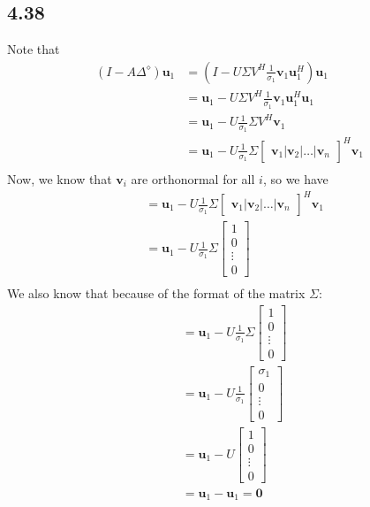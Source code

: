 \documentclass[letterpaper,12pt]{article}
\theoremstyle{definition}
\begin{document}
\subsection*{4.38}
Note that
\begin{align*}
    (I - A\Delta^{\diamond})\textbf{u}_1 &= (I - U\Sigma V^H\frac{1}{\sigma_1}\textbf{v}_1 \textbf{u}_1^H) \textbf{u}_1 \\
    &=  \textbf{u}_1 - U\Sigma V^H\frac{1}{\sigma_1}\textbf{v}_1 \textbf{u}_1^H \textbf{u}_1 \\
    &=  \textbf{u}_1 - U\frac{1}{\sigma_1}\Sigma V^H\textbf{v}_1 \\
    &=  \textbf{u}_1 - U\frac{1}{\sigma_1}\Sigma     
    \begin{bmatrix} \textbf{v}_1 | \textbf{v}_2 | \dots |\textbf{v}_n \end{bmatrix}^H\textbf{v}_1 \\
\end{align*}
Now, we know that $\textbf{v}_i$ are orthonormal for all $i$, so we have 
\begin{align*}
    &=  \textbf{u}_1 - U\frac{1}{\sigma_1}\Sigma     
    \begin{bmatrix} \textbf{v}_1 | \textbf{v}_2 | \dots |\textbf{v}_n \end{bmatrix}^H\textbf{v}_1 \\
    &=  \textbf{u}_1 - U\frac{1}{\sigma_1}\Sigma     
    \begin{bmatrix} 1\\ 0 \\ \vdots \\ 0 \end{bmatrix} \\
\end{align*}
We also know that because of the format of the matrix $\Sigma$:
\begin{align*}
    &=  \textbf{u}_1 - U\frac{1}{\sigma_1}\Sigma \begin{bmatrix} 1\\ 0 \\ \vdots \\ 0 \end{bmatrix} \\
    &=  \textbf{u}_1 - U\frac{1}{\sigma_1}\begin{bmatrix} \sigma_1 \\ 0 \\ \vdots \\ 0 \end{bmatrix} \\
    &=  \textbf{u}_1 - U\begin{bmatrix} 1 \\ 0 \\ \vdots \\ 0 \end{bmatrix} \\
        &=  \textbf{u}_1 - \textbf{u}_1  = \textbf{0}\\
\end{align*}
\end{document}
